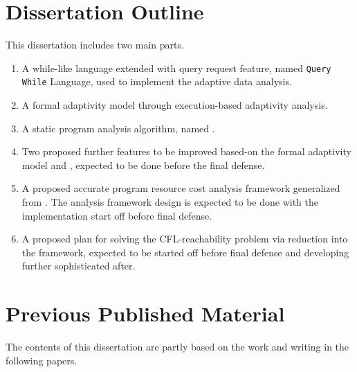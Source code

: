 


\section{Dissertation Outline}
This dissertation includes two main parts. 
\begin{enumerate}
\item A while-like language extended with query request feature, named {\tt Query While} Language, 
used to implement 
the adaptive data analysis.
\item A formal adaptivity model through execution-based adaptivity analysis.
\item A static program analysis algorithm, named {\THESYSTEM}.
\item Two proposed further features to be improved based-on the formal adaptivity model and {\THESYSTEM},
 expected to be done before the final defense.
\item A proposed accurate program resource cost analysis framework generalized from {\THESYSTEM}. 
The analysis framework design is expected to be done with the implementation start off before final defense.
\item A proposed plan for solving the CFL-reachability problem via reduction into the {\THESYSTEM} framework,
expected to be started off before final defense and developing further sophisticated after.
\end{enumerate}



\section{Previous Published Material}
The contents of this dissertation are partly based on the work and writing in the following papers.



